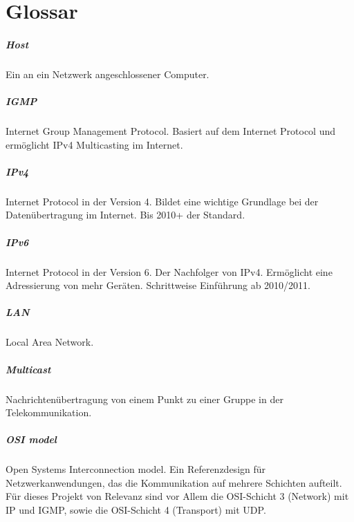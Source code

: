 \chapter{Glossar}
\label{cha:glos}

\paragraph{Host} Ein an ein Netzwerk angeschlossener Computer.

\paragraph{IGMP} Internet Group Management Protocol. Basiert auf dem Internet Protocol und ermöglicht IPv4 Multicasting im Internet. \\

\paragraph{IPv4} Internet Protocol in der Version 4. Bildet eine wichtige Grundlage bei der Datenübertragung im Internet. Bis 2010+ der Standard. \\

\paragraph{IPv6} Internet Protocol in der Version 6. Der Nachfolger von IPv4. Ermöglicht eine Adressierung von mehr Geräten. Schrittweise Einführung ab 2010/2011.\\

\paragraph{LAN} Local Area Network. 

\paragraph{Multicast} Nachrichtenübertragung von einem Punkt zu einer Gruppe in der Telekommunikation.\\

\paragraph{OSI model} Open Systems Interconnection model. Ein Referenzdesign für
Netzwerkanwendungen, das die Kommunikation auf mehrere Schichten aufteilt. Für
dieses Projekt von Relevanz sind vor Allem die OSI-Schicht 3 (Network) mit IP
und IGMP, sowie die OSI-Schicht 4 (Transport) mit UDP.


